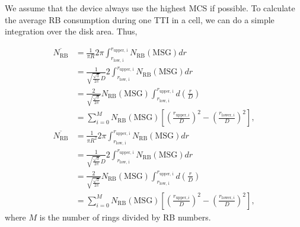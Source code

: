 We assume that the device always use the highest MCS if possible. To calculate the average RB consumption during one TTI in a cell, we can do a simple integration over the disk area. Thus, 



\begin{align}
	\overline{N_{\text{RB}}}  &= \frac{1}{\pi R} 2 \pi \int_{r_{\text{low, i}}}^{r_{\text{upper, i}}} N_{\text{RB}}(\text{MSG})  dr \\
	&=  \frac{1}{ \sqrt{\frac{\sqrt{3}}{2\pi}} D }2 \int_{r_{\text{low, i}}}^{r_{\text{upper, i}}} N_{\text{RB}}(\text{MSG})  dr \\
	&=  \frac{2}{ \sqrt{\frac{\sqrt{3}}{2\pi}} } N_{\text{RB}}(\text{MSG})  \int_{r_{\text{low, i}}}^{r_{\text{upper, i}}} d (\frac{r}{D}) \\
	&=  \sum_{i=0}^{M}   N_{\text{RB}}(\text{MSG})[(\frac{r_{\text{upper}, i}}{D})^2 - (\frac{r_{\text{lower}, i}}{D})^2] ,
\end{align}
\begin{align}
	\overline{N_{\text{RB}}}  &= \frac{1}{\pi R^2}2 \pi \int_{r_{\text{low, i}}}^{r_{\text{upper, i}}} N_{\text{RB}}(\text{MSG})  dr \\
	&=  \frac{1}{ \sqrt{\frac{\sqrt{3}}{2\pi}} D }2 \int_{r_{\text{low, i}}}^{r_{\text{upper, i}}} N_{\text{RB}}(\text{MSG})  dr \\
	&=  \frac{2}{ \sqrt{\frac{\sqrt{3}}{2\pi}} } N_{\text{RB}}(\text{MSG})  \int_{r_{\text{low, i}}}^{r_{\text{upper, i}}} d (\frac{r}{D}) \\
	&=  \sum_{i=0}^{M}   N_{\text{RB}}(\text{MSG})[(\frac{r_{\text{upper}, i}}{D})^2 - (\frac{r_{\text{lower}, i}}{D})^2] ,
\end{align}
where $M$ is the number of rings divided by RB numbers.
